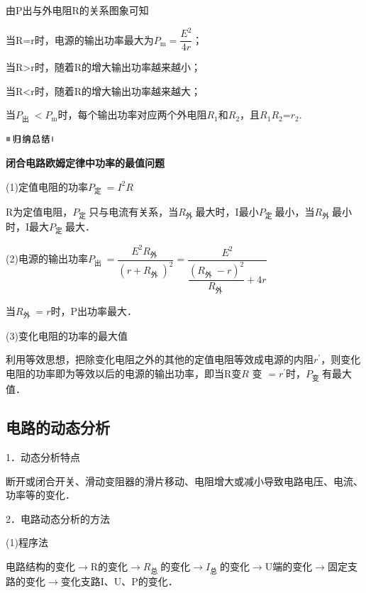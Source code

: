 由P出与外电阻R的关系图象可知

当R=r时，电源的输出功率最大为$P_{\mathrm{m}}=\dfrac{E^{2}}{4 r}$；

当R\textgreater r时，随着R的增大输出功率越来越小；

当R\textless r时，随着R的增大输出功率越来越大；

当$P_{\text {出 }}<P_{\mathrm{m}}$时，每个输出功率对应两个外电阻$R_1$和$R_2$，且$R_1$$R_2$=$r_2$.

\begin{center}\includegraphics[width=0.70764in,height=0.12292in]{media/image13.png}\end{center}
\begin{center}
	\textbf{闭合电路欧姆定律中功率的最值问题}
\end{center}

(1)定值电阻的功率$P_{\text {定 }}=I^{2} R$

R为定值电阻，$P_{\text {定 }}$只与电流有关系，当$R_{\text {外 }}$最大时，I最小$P_{\text {定 }}$最小，当$R_{\text {外 }}$最小时，I最大$P_{\text {定 }}$最大．

(2)电源的输出功率$P_{\text {出 }}=\dfrac{E^{2} R_{\text {外 }}}{\left(r+R_{\text {外 }}\right)^{2}}=\dfrac{E^{2}}{\dfrac{\left(R_{\text {外 }}-r\right)^{2}}{R_{\text {外 }}}+4 r}$

当$R_{\text {外 }}=r$时，P出功率最大．

(3)变化电阻的功率的最大值

利用等效思想，把除变化电阻之外的其他的定值电阻等效成电源的内阻$r^{\prime}$，则变化电阻的功率即为等效以后的电源的输出功率，即当R变$R$ 变 $=r^{\prime}$时，$P_{\text {变 }}$有最大值．

\newpage
\subsection{电路的动态分析}

1．动态分析特点

断开或闭合开关、滑动变阻器的滑片移动、电阻增大或减小导致电路电压、电流、功率等的变化．

2．电路动态分析的方法

(1)程序法

电路结构的变化$\rightarrow$R的变化$\rightarrow$$R_{\text {总 }}$的变化$\rightarrow$$I_{\text {总 }}$的变化$\rightarrow$U端的变化$\rightarrow$固定支路的变化$\rightarrow$变化支路I、U、P的变化．

